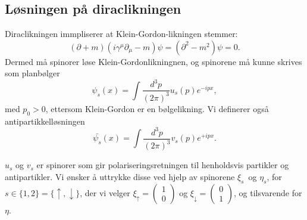 \documentclass{article}
\begin{document}
\subsection{Løsningen på diraclikningen}
\label{løsning_på_diraclikningen}
Diraclikningen immpliserer at Klein-Gordon-likningen stemmer:
\begin{equation*}
    (\partial + m) (i \gamma^\mu \partial_\mu - m) \psi 
    = (\partial^2 - m^2) \psi
    = 0.
\end{equation*}
Dermed må spinorer løse Klein-Gordonlikningnen, og spinorene må kunne skrives som planbølger
\begin{equation}
    \label{diracfelt}
    \psi_s(x) = \int \frac{d^3 p}{(2\pi)^3} u_s(p) e^{-ipx},
\end{equation}
med $p_0 > 0$, ettersom Klein-Gordon er en bølgelikning.
Vi definerer også antipartikkelløsningen
\begin{equation}
    \label{diracfelt_anti}
    \bar{\psi_s}(x) = \int \frac{d^3 p}{(2\pi)^3} v_s(p) e^{+ipx}.
\end{equation}

$u_s$ og $v_s$ er spinorer som gir polariseringsretningen til henholdsvis partikler og antipartikler.
Vi ønsker å uttrykke disse ved hjelp av spinorene $\xi_s$ og $\eta_s$, for 
$s \in \{1,2\} = \{\uparrow, \downarrow\}$, der vi velger 
$\xi_\uparrow = \begin{pmatrix*} 1 \\ 0 \end{pmatrix*}$ og 
$\xi_\downarrow = \begin{pmatrix*} 0 \\ 1 \end{pmatrix*}$, og tilsvarende for $\eta$.
\end{document}
